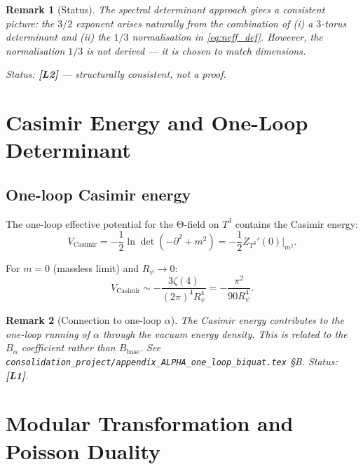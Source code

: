 \documentclass[11pt,a4paper]{article}
\newtheorem{remark}{Remark}
\begin{document}
\begin{remark}[Status]
  The spectral determinant approach gives a \emph{consistent} picture:
  the $3/2$ exponent arises naturally from the combination of (i) a
  $3$-torus determinant and (ii) the $1/3$ normalisation in
  \eqref{eq:neff_def}.  However, the normalisation $1/3$ is not derived
  — it is chosen to match dimensions.

  Status: \textbf{[L2]} — structurally consistent, not a proof.
\end{remark}

\section{Casimir Energy and One-Loop Determinant}
\label{sec:casimir}

\subsection{One-loop Casimir energy}

The one-loop effective potential for the Θ-field on $T^3$ contains the
Casimir energy:
\begin{equation}
\label{eq:casimir}
  V_{\mathrm{Casimir}} = -\frac{1}{2}\ln\det(-\partial^2 + m^2)
  = -\frac{1}{2} Z_{T^3}'(0)|_{m^2}.
\end{equation}

For $m = 0$ (massless limit) and $R_\psi \to 0$:
\begin{equation}
  V_{\mathrm{Casimir}} \sim -\frac{3\zeta(4)}{(2\pi)^4 R_\psi^4}
  = -\frac{\pi^2}{90 R_\psi^4}.
\end{equation}

\begin{remark}[Connection to one-loop $\alpha$]
  The Casimir energy contributes to the one-loop running of $\alpha$ through
  the vacuum energy density.  This is related to the $B_\alpha$ coefficient
  rather than $B_{\mathrm{base}}$.  See
  \texttt{consolidation\_project/appendix\_ALPHA\_one\_loop\_biquat.tex} §B.
  Status: \textbf{[L1]}.
\end{remark}

\section{Modular Transformation and Poisson Duality}
\label{sec:poisson}
\end{document}
